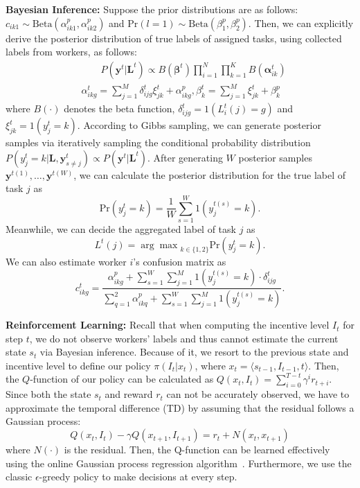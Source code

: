 \documentclass[letterpaper]{article} %
\begin{document}
\noindent \textbf{Bayesian Inference:} Suppose the prior distributions are as follows: $c_{ik1}\sim \textrm{Beta}(\alpha^{p}_{ik1},\alpha^{p}_{ik2})$ and $\textrm{Pr}(l=1)\sim \textrm{Beta}(\beta^{p}_{1},\beta^{p}_{2})$. Then, we can explicitly derive the posterior distribution of true labels of assigned tasks, using collected labels from workers, as follows:
\begin{equation}
\label{PostDist}
\begin{split}
&\qquad P(\bm{y}^{t}|\bm{L}^{t})\propto B(\bm{\beta}^{t}){\prod}_{i=1}^{N}{\prod}_{k=1}^{K} B(\bm{\alpha}^{t}_{ik}) \\ 
&\alpha^{t}_{ikg}={\sum}_{j=1}^{M}\delta^{t}_{ijg}\xi^{t}_{jk}+\alpha^{p}_{ikg}, \beta^{t}_k={\sum}_{j=1}^{M}\xi^{t}_{jk}+\beta^{p}_{k}
\end{split}
\end{equation}
where $B(\cdot)$ denotes the beta function, $\delta^{t}_{ijg}=1(L^t_i(j)=g)$ and $\xi^{t}_{jk}= 1(y^{t}_j=k)$. According to Gibbs sampling, we can generate posterior samples via iteratively sampling the conditional probability distribution $P(y^{t}_j=k|\bm{L}, \bm{y}^t_{s\neq j})\propto P(\bm{y}^{t}|\bm{L}^{t})$.
After generating $W$ posterior samples $\bm{y}^{t(1)},\ldots,\bm{y}^{t(W)}$, we can calculate the posterior distribution for the true label of task $j$ as
\begin{equation}
\textrm{Pr}(y^{t}_j=k)=\frac{1}{W}{\sum}_{s=1}^{W}1(y^{t(s)}_j=k).
\end{equation}
Meanwhile, we can decide the aggregated label of task $j$ as
\begin{equation}
L^{t}(j)={\arg\max}_{k\in\{1,2\}}\textrm{Pr}(y^{t}_j=k).
\end{equation}
We can also estimate worker $i$'s confusion matrix as
\begin{equation}
c^{t}_{ikg}=\frac{\alpha_{ikg}^{p}+\sum_{s=1}^{W}\sum_{j=1}^{M}1(y^{t(s)}_j=k)\cdot \delta^{t}_{ijg}}{\sum_{q=1}^2\alpha_{ikq}^{p}+\sum_{s=1}^{W}\sum_{j=1}^{M}1(y^{t(s)}_j=k)}.
\end{equation}


\noindent \textbf{Reinforcement Learning:} Recall that when computing the incentive level $I_{t}$ for step $t$, we do not observe workers' labels and thus cannot estimate the current state $s_{t}$ via Bayesian inference.
Because of it, we resort to the previous state and incentive level to define our  policy $\pi(I_{t}|x_t)$, where $x_t=\langle s_{t-1}, I_{t-1}, t \rangle$.
Then, the $Q$-function of our policy can be calculated as
$Q(x_t, I_t)= \sum_{i=0}^{T-t} \gamma^{i} r_{t+i}$.  %
Since both the state $s_t$ and reward $r_t$ can not be accurately observed, we have to approximate the temporal difference (TD) by assuming that the residual follows a Gaussian process: 
\begin{equation}
Q(x_t, I_t) - \gamma Q(x_{t+1}, I_{t+1}) = r_t + N(x_t,x_{t+1})
\end{equation}
where $N(\cdot)$ is the residual. Then, the Q-function can be learned effectively using the online Gaussian process regression algorithm~\cite{engel2005reinforcement}. Furthermore, we use the classic $\epsilon$-greedy policy to make decisions at every step.
\end{document}

